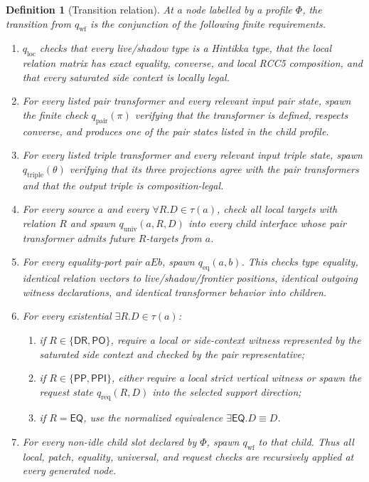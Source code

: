 \documentclass[11pt]{article}
\newtheorem{definition}[theorem]{Definition}
\newcommand{\EQ}{\mathsf{EQ}}
\newcommand{\PP}{\mathsf{PP}}
\newcommand{\PPI}{\mathsf{PPI}}
\newcommand{\PO}{\mathsf{PO}}
\newcommand{\DR}{\mathsf{DR}}
\begin{document}
\begin{definition}[Transition relation]
At a node labelled by a profile $\Phi$, the transition from $q_{\mathrm{wf}}$ is the conjunction of the following finite requirements.
\begin{enumerate}[label=(Q\arabic*)]
\item $q_{\mathrm{loc}}$ checks that every live/shadow type is a Hintikka type, that the local relation matrix has exact equality, converse, and local RCC5 composition, and that every saturated side context is locally legal.
\item For every listed pair transformer and every relevant input pair state, spawn the finite check $q_{\mathrm{pair}}(\pi)$ verifying that the transformer is defined, respects converse, and produces one of the pair states listed in the child profile.
\item For every listed triple transformer and every relevant input triple state, spawn $q_{\mathrm{triple}}(\theta)$ verifying that its three projections agree with the pair transformers and that the output triple is composition-legal.
\item For every source $a$ and every $\forall R.D\in\tau(a)$, check all local targets with relation $R$ and spawn $q_{\mathrm{univ}}(a,R,D)$ into every child interface whose pair transformer admits future $R$-targets from $a$.
\item For every equality-port pair $aEb$, spawn $q_{\mathrm{eq}}(a,b)$.  This checks type equality, identical relation vectors to live/shadow/frontier positions, identical outgoing witness declarations, and identical transformer behavior into children.
\item For every existential $\exists R.D\in\tau(a)$:
\begin{enumerate}[label=(Q6.\alph*)]
\item if $R\in\{\DR,\PO\}$, require a local or side-context witness represented by the saturated side context and checked by the pair representative;
\item if $R\in\{\PP,\PPI\}$, either require a local strict vertical witness or spawn the request state $q_{\mathrm{req}}(R,D)$ into the selected support direction;
\item if $R=\EQ$, use the normalized equivalence $\exists\EQ.D\equiv D$.
\end{enumerate}
\item For every non-idle child slot declared by $\Phi$, spawn $q_{\mathrm{wf}}$ to that child.  Thus all local, patch, equality, universal, and request checks are recursively applied at every generated node.
\end{enumerate}
\end{definition}
\end{document}
